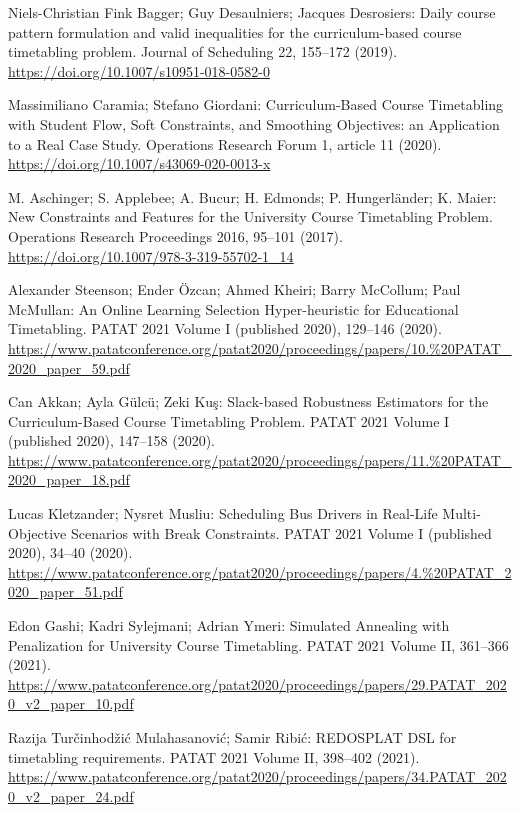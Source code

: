 Niels-Christian Fink Bagger; Guy Desaulniers; Jacques Desrosiers: Daily course pattern formulation and valid inequalities for the curriculum-based course timetabling problem. Journal of Scheduling 22, 155--172 (2019). \url{https://doi.org/10.1007/s10951-018-0582-0}

 Massimiliano Caramia; Stefano Giordani: Curriculum-Based Course Timetabling with Student Flow, Soft Constraints, and Smoothing Objectives: an Application to a Real Case Study. Operations Research Forum 1, article 11 (2020). \url{https://doi.org/10.1007/s43069-020-0013-x}

 M. Aschinger; S. Applebee; A. Bucur; H. Edmonds; P. Hungerl{\"a}nder; K. Maier: New Constraints and Features for the University Course Timetabling Problem. Operations Research Proceedings 2016, 95--101 (2017). \url{https://doi.org/10.1007/978-3-319-55702-1_14}

 Alexander Steenson; Ender {\"O}zcan; Ahmed Kheiri; Barry McCollum; Paul McMullan: An Online Learning Selection Hyper-heuristic for Educational Timetabling. PATAT 2021 Volume I (published 2020), 129--146 (2020). \url{https://www.patatconference.org/patat2020/proceedings/papers/10.%20PATAT_2020_paper_59.pdf}

 Can Akkan; Ayla G{\"u}lc{\"u}; Zeki Ku{\c s}: Slack-based Robustness Estimators for the Curriculum-Based Course Timetabling Problem. PATAT 2021 Volume I (published 2020), 147--158 (2020). \url{https://www.patatconference.org/patat2020/proceedings/papers/11.%20PATAT_2020_paper_18.pdf}

 Lucas Kletzander; Nysret Musliu: Scheduling Bus Drivers in Real-Life Multi-Objective Scenarios with Break Constraints. PATAT 2021 Volume I (published 2020), 34--40 (2020). \url{https://www.patatconference.org/patat2020/proceedings/papers/4.%20PATAT_2020_paper_51.pdf}

 Edon Gashi; Kadri Sylejmani; Adrian Ymeri: Simulated Annealing with Penalization for University Course Timetabling. PATAT 2021 Volume II, 361--366 (2021). \url{https://www.patatconference.org/patat2020/proceedings/papers/29.PATAT_2020_v2_paper_10.pdf}

 Razija Tur{\v c}inhod{\v z}i{\'c} Mulahasanovi{\'c}; Samir Ribi{\'c}: REDOSPLAT DSL for timetabling requirements. PATAT 2021 Volume II, 398--402 (2021). \url{https://www.patatconference.org/patat2020/proceedings/papers/34.PATAT_2020_v2_paper_24.pdf}

